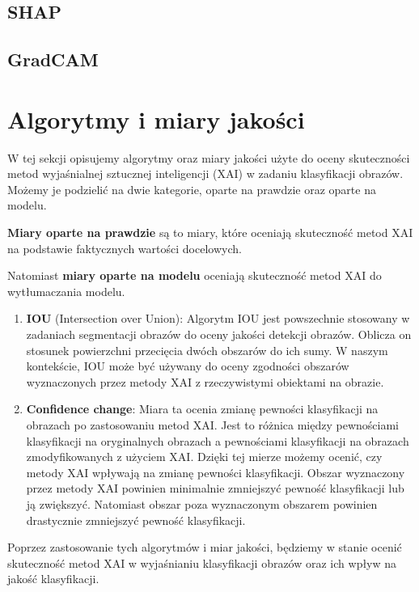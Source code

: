 \subsection*{SHAP}

\subsection*{GradCAM}

\section*{Algorytmy i miary jakości}

W tej sekcji opisujemy algorytmy oraz miary jakości użyte do oceny skuteczności metod wyjaśnialnej sztucznej inteligencji (XAI) w zadaniu klasyfikacji obrazów.
Możemy je podzielić na dwie kategorie, oparte na prawdzie oraz oparte na modelu.

\textbf{Miary oparte na prawdzie} są to miary, które oceniają skuteczność metod XAI na podstawie faktycznych wartości docelowych.

Natomiast \textbf{miary oparte na modelu} oceniają skuteczność metod XAI do wytłumaczania modelu.

\begin{enumerate}
	\item \textbf{IOU} (Intersection over Union): Algorytm IOU jest powszechnie stosowany w zadaniach segmentacji obrazów do oceny jakości detekcji obrazów.
	      Oblicza on stosunek powierzchni przecięcia dwóch obszarów do ich sumy.
	      W naszym kontekście, IOU może być używany do oceny zgodności obszarów wyznaczonych przez metody XAI z rzeczywistymi obiektami na obrazie.

	\item \textbf{Confidence change}: Miara ta ocenia zmianę pewności klasyfikacji na obrazach po zastosowaniu metod XAI.
	      Jest to różnica między pewnościami klasyfikacji na oryginalnych obrazach a pewnościami klasyfikacji na obrazach zmodyfikowanych z użyciem XAI.
	      Dzięki tej mierze możemy ocenić, czy metody XAI wpływają na zmianę pewności klasyfikacji.
	      Obszar wyznaczony przez metody XAI powinien minimalnie zmniejszyć pewność klasyfikacji lub ją zwiększyć.
	      Natomiast obszar poza wyznaczonym obszarem powinien drastycznie zmniejszyć pewność klasyfikacji.
\end{enumerate}

Poprzez zastosowanie tych algorytmów i miar jakości, będziemy w stanie ocenić skuteczność metod XAI w wyjaśnianiu klasyfikacji obrazów oraz ich wpływ na jakość klasyfikacji.

